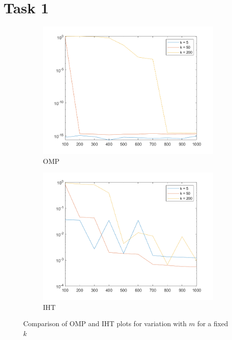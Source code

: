 \documentclass[a4paper, landscape]{article}
\begin{document}
\section{Task 1}
\begin{figure}[H]
    \centering
    \begin{subfigure}{0.45\linewidth}
        \centering
        \includegraphics[width=\linewidth]{omp/plot k.png}
        \caption{OMP}
    \end{subfigure}
    \begin{subfigure}{0.45\linewidth}
        \centering
        \includegraphics[width=\linewidth]{iht/plot k.png}
        \caption{IHT}
    \end{subfigure}
    \caption{Comparison of OMP and IHT plots for variation with $m$ for a fixed $k$}
    \label{fig:ck}
\end{figure}
\end{document}
